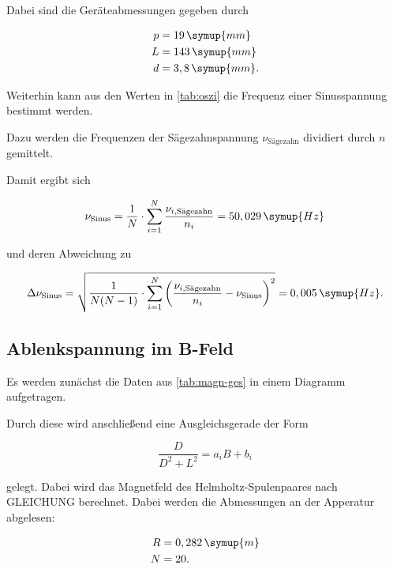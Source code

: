 Dabei sind die Geräteabmessungen gegeben durch

\begin{align*}
  p &= 19  \, \symup{mm} \\
  L &= 143 \, \symup{mm} \\
  d &= 3,8 \, \symup{mm}.
\end{align*}

Weiterhin kann aus den Werten in \autoref{tab:oszi} die Frequenz einer Sinusspannung bestimmt werden.



Dazu werden die Frequenzen der Sägezahnspannung $\nu_\text{Sägezahn}$ dividiert durch $n$ gemittelt.

Damit ergibt sich 

\begin{equation}
  \nu_\text{Sinus} = \frac{1}{N} \cdot \sum_{i=1}^{N} \frac{\nu_{i, \text{Sägezahn}} }{n_i} = 50,029 \, \symup{Hz}
\end{equation}

und deren Abweichung zu 

\begin{equation}
  \Delta \nu_\text{Sinus} = \sqrt{ \frac{1}{N(N-1)} \cdot \sum_{i=1}^{N} \bigg( \frac{\nu_{i, \text{Sägezahn}}}{n_i} - \nu_\text{Sinus} \bigg)^2 } = 0,005 \, \symup{Hz}.
\end{equation}


\subsection{Ablenkspannung im B-Feld}

Es werden zunächst die Daten aus \autoref{tab:magn-ges} in einem Diagramm aufgetragen.



Durch diese wird anschließend eine Ausgleichsgerade der Form

\begin{equation}
  \frac{D}{D^2 + L^2} = a_i B + b_i
\end{equation}

gelegt. Dabei wird das Magnetfeld des Helmholtz-Spulenpaares nach GLEICHUNG berechnet.
Dabei werden die Abmessungen an der Apperatur abgelesen:

\begin{align*}
  R &= 0,282 \, \symup{m} \\
  N &= 20.
\end{align*}

